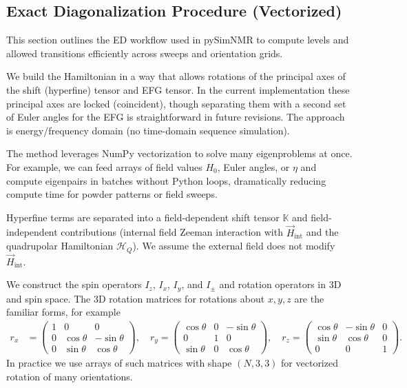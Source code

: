 \documentclass[12pt]{article}
\begin{document}
\subsection{Exact Diagonalization Procedure (Vectorized)}
This section outlines the ED workflow used in pySimNMR to compute levels and allowed transitions efficiently across sweeps and orientation grids.

We build the Hamiltonian in a way that allows rotations of the principal axes of the shift (hyperfine) tensor and EFG tensor. In the current implementation these principal axes are locked (coincident), though separating them with a second set of Euler angles for the EFG is straightforward in future revisions. The approach is energy/frequency domain (no time-domain sequence simulation).

The method leverages NumPy vectorization to solve many eigenproblems at once. For example, we can feed arrays of field values \(H_0\), Euler angles, or \(\eta\) and compute eigenpairs in batches without Python loops, dramatically reducing compute time for powder patterns or field sweeps.

Hyperfine terms are separated into a field-dependent shift tensor \(\mathbb{K}\) and field-independent contributions (internal field Zeeman interaction with \(\vec{H}_{\mathrm{int}}\) and the quadrupolar Hamiltonian \(\mathcal{H}_Q\)). We assume the external field does not modify \(\vec{H}_{\mathrm{int}}\).

We construct the spin operators \(I_z\), \(I_x\), \(I_y\), and \(I_\pm\) and rotation operators in 3D and spin space. The 3D rotation matrices for rotations about \(x,y,z\) are the familiar forms, for example
\begin{equation}
\begin{aligned}
r_x &=
\begin{pmatrix}
1 & 0 & 0\\
0 & \cos\theta & -\sin\theta\\
0 & \sin\theta & \cos\theta
\end{pmatrix},\quad
r_y =
\begin{pmatrix}
\cos\theta & 0 & -\sin\theta\\
0 & 1 & 0\\
\sin\theta & 0 & \cos\theta
\end{pmatrix},\quad
r_z =
\begin{pmatrix}
\cos\theta & -\sin\theta & 0\\
\sin\theta & \cos\theta & 0\\
0 & 0 & 1
\end{pmatrix}.
\end{aligned}
\end{equation}
In practice we use arrays of such matrices with shape \((N,3,3)\) for vectorized rotation of many orientations.
\end{document}
